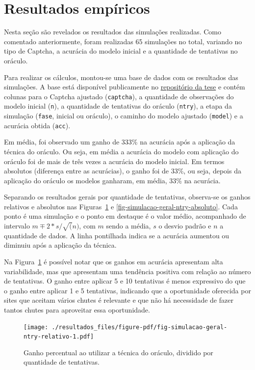 \documentclass[12pt,twoside,brazilian]{book}
\begin{document}
\hypertarget{sec-result-sim}{%
\section{Resultados empíricos}\label{sec-result-sim}}

Nesta seção são revelados os resultados das simulações realizadas. Como
comentado anteriormente, foram realizadas 65 simulações no total,
variando no tipo de Captcha, a acurácia do modelo inicial e a quantidade
de tentativas no oráculo.

Para realizar os cálculos, montou-se uma base de dados com os resultados
das simulações. A base está disponível publicamente no
\href{https://github.com/jtrecenti/doutorado}{repositório da tese} e
contém colunas para o Captcha ajustado (\texttt{captcha}), a quantidade
de observações do modelo inicial (\texttt{n}), a quantidade de
tentativas do oráculo (\texttt{ntry}), a etapa da simulação
(\texttt{fase}, inicial ou oráculo), o caminho do modelo ajustado
(\texttt{model}) e a acurácia obtida (\texttt{acc}).

Em média, foi observado um ganho de 333\% na acurácia após a aplicação
da técnica do oráculo. Ou seja, em média a acurácia do modelo com
aplicação do oráculo foi de mais de três vezes a acurácia do modelo
inicial. Em termos absolutos (diferença entre as acurácias), o ganho foi
de 33\%, ou seja, depois da aplicação do oráculo os modelos ganharam, em
média, 33\% na acurácia.

Separando os resultados gerais por quantidade de tentativas, observa-se
os ganhos relativos e absolutos nas
Figuras~\ref{fig-simulacao-geral-ntry-relativo} e
\ref{fig-simulacao-geral-ntry-absoluto}. Cada ponto é uma simulação e o
ponto em destaque é o valor médio, acompanhado de intervalo
\(m \mp 2*s/\sqrt(n)\), com \(m\) sendo a média, \(s\) o desvio padrão e
\(n\) a quantidade de dados. A linha pontilhada indica se a acurácia
aumentou ou diminuiu após a aplicação da técnica.

Na Figura~\ref{fig-simulacao-geral-ntry-relativo} é possível notar que
os ganhos em acurácia apresentam alta variabilidade, mas que apresentam
uma tendência positiva com relação ao número de tentativas. O ganho
entre aplicar 5 e 10 tentativas é menos expressivo do que o ganho entre
aplicar 1 e 5 tentativas, indicando que a oportunidade oferecida por
sites que aceitam vários chutes é relevante e que não há necessidade de
fazer tantos chutes para aproveitar essa oportunidade.

\begin{figure}

{\centering \texttt{[image: ./resultados\_files/figure-pdf/fig-simulacao-geral-ntry-relativo-1.pdf]}

}

\caption{\label{fig-simulacao-geral-ntry-relativo}Ganho percentual ao
utilizar a técnica do oráculo, dividido por quantidade de tentativas.}

\end{figure}
\end{document}
